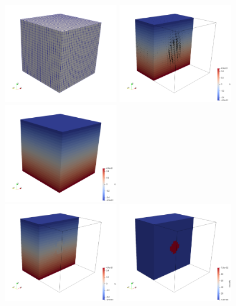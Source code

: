 



\begin{center}
\includegraphics[width=5cm]{python_codes/fieldstone_10/grid}
\includegraphics[width=5cm]{python_codes/fieldstone_10/vel}
\includegraphics[width=5cm]{python_codes/fieldstone_10/press}\\
\includegraphics[width=5cm]{python_codes/fieldstone_10/press2}
\includegraphics[width=5cm]{python_codes/fieldstone_10/visc}

\end{center}
